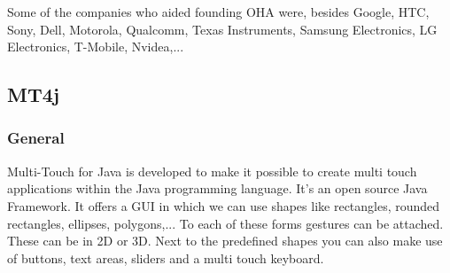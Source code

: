 \documentclass[a4paper,12pt]{report}
\begin{document}
Some of the companies who aided founding OHA were, besides Google, HTC, Sony, Dell, Motorola, Qualcomm, Texas Instruments, Samsung Electronics, LG Electronics, T-Mobile,
Nvidea,... 
\subsection{MT4j}
\subsubsection{General}
Multi-Touch for Java is developed to make it possible to create multi touch applications within the Java programming language. It's an open source Java Framework. It offers a GUI in which we can use
shapes like rectangles, rounded rectangles, ellipses, polygons,... To each of these forms gestures can be attached. These can be in 2D or 3D. Next to the predefined shapes you can also make use 
of buttons, text areas, sliders and a multi touch keyboard.
\end{document}
